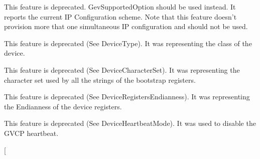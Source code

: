 \begin{DoxyRefList}
\item[\label{deprecated__deprecated000066}%
\hypertarget{deprecated__deprecated000066}{}%
成员 \hyperlink{classmv_i_m_p_a_c_t_1_1acquire_1_1_gen_i_cam_1_1_transport_layer_control_aca1945229a6695d6c1c6a82549ef1f4c}{mv\+I\+M\+P\+A\+C\+T\+:\+:acquire\+:\+:Gen\+I\+Cam\+:\+:Transport\+Layer\+Control\+:\+:gev\+Current\+I\+P\+Configuration} ]This feature is deprecated. Gev\+Supported\+Option should be used instead. It reports the current I\+P Configuration scheme. Note that this feature doesn't provision more that one simultaneous I\+P configuration and should not be used. 
\item[\label{deprecated__deprecated000060}%
\hypertarget{deprecated__deprecated000060}{}%
成员 \hyperlink{classmv_i_m_p_a_c_t_1_1acquire_1_1_gen_i_cam_1_1_transport_layer_control_ae45e57b8dbf5f7326d7821b34ca5b937}{mv\+I\+M\+P\+A\+C\+T\+:\+:acquire\+:\+:Gen\+I\+Cam\+:\+:Transport\+Layer\+Control\+:\+:gev\+Device\+Class} ]This feature is deprecated (See Device\+Type). It was representing the class of the device. 
\item[\label{deprecated__deprecated000061}%
\hypertarget{deprecated__deprecated000061}{}%
成员 \hyperlink{classmv_i_m_p_a_c_t_1_1acquire_1_1_gen_i_cam_1_1_transport_layer_control_a78dd1674e999f062707bf819a570168a}{mv\+I\+M\+P\+A\+C\+T\+:\+:acquire\+:\+:Gen\+I\+Cam\+:\+:Transport\+Layer\+Control\+:\+:gev\+Device\+Mode\+Character\+Set} ]This feature is deprecated (See Device\+Character\+Set). It was representing the character set used by all the strings of the bootstrap registers. 
\item[\label{deprecated__deprecated000059}%
\hypertarget{deprecated__deprecated000059}{}%
成员 \hyperlink{classmv_i_m_p_a_c_t_1_1acquire_1_1_gen_i_cam_1_1_transport_layer_control_a50239d950e31b55c2b789ed5069963b4}{mv\+I\+M\+P\+A\+C\+T\+:\+:acquire\+:\+:Gen\+I\+Cam\+:\+:Transport\+Layer\+Control\+:\+:gev\+Device\+Mode\+Is\+Big\+Endian} ]This feature is deprecated (See Device\+Registers\+Endianness). It was representing the Endianness of the device registers.  
\item[\label{deprecated__deprecated000082}%
\hypertarget{deprecated__deprecated000082}{}%
成员 \hyperlink{classmv_i_m_p_a_c_t_1_1acquire_1_1_gen_i_cam_1_1_transport_layer_control_a77e81761dc28f1064f3332f384b3977e}{mv\+I\+M\+P\+A\+C\+T\+:\+:acquire\+:\+:Gen\+I\+Cam\+:\+:Transport\+Layer\+Control\+:\+:gev\+G\+V\+C\+P\+Heartbeat\+Disable} ]This feature is deprecated (See Device\+Heartbeat\+Mode). It was used to disable the G\+V\+C\+P heartbeat.  
\item[\label{deprecated__deprecated000083}%

\end{DoxyRefList}
